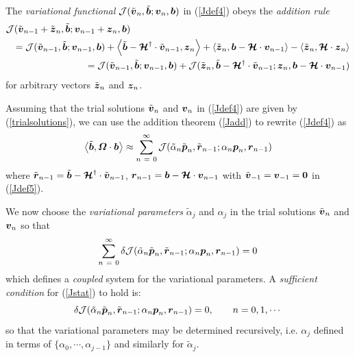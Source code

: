 The {\em variational functional\/} ${\cal J}(\tilde{\mbox{\boldmath$\mit v$\unboldmath}}_n,\tilde{\mbox{\boldmath$\mit b$\unboldmath}};{\mbox{\boldmath$\mit v$\unboldmath}}_n, {\mbox{\boldmath$\mit b$\unboldmath}})$ in (\ref{Jdef4}) obeys the {\em addition rule}
\begin{eqnarray} \label{Jadd}
\lefteqn{{\cal 
J}({\tilde{\bmi  v}}_{n-1}+{\tilde{\bmi  z}}_{n},\tilde{\bmi  b};{\bmi  
v}_{n-1}+{\bmi  z}_{n},{\bmi  b})}\nonumber\\
&&={\cal J}({\tilde{\bmi  v}}_{n-1},\tilde{\bmi  b};{\bmi  v}_{n-1},{\bmi  
b})+\left\langle{\tilde{\bmi  b}-
{\CB H}^{\dagger} \cdot {\tilde{\bmi   v}}_{  n-1}  
,{\bmi  z}_{n}}\right\rangle+
\left\langle{{\tilde{\bmi  z}}_{n},{\bmi  b}-{\CB H} \cdot {  
\bmi  v}_{  n-1}}\right\rangle-\left\langle{{\tilde{\bmi  z}}_{n},{\CB H} 
\cdot 
{\bmi   z}_{  n}}\right\rangle\nonumber\\
&&=
{\cal J}({\tilde{\bmi  v}}_{n-1},\tilde{\bmi  b};{\bmi  v}_{n-1},{\bmi  
b})+
{\cal J}({\tilde{\bmi  z}}_{n},\tilde{\bmi  b}-{\CB H}^{\dagger}\cdot 
{\tilde{\bmi  
v}}_{n-1};
{{\bmi  z}}_{n},{\bmi  b}-{\CB H}\cdot {{\bmi  v}}_{n-1})
\end{eqnarray}
for arbitrary vectors ${\tilde{\mbox{\boldmath$\mit z$\unboldmath}}}_{n}$ and ${{\mbox{\boldmath$\mit z$\unboldmath}}}_{n}$. 

Assuming that the trial solutions $\tilde{\mbox{\boldmath$\mit v$\unboldmath}}{}_{n}$ and ${\mbox{\boldmath$\mit v$\unboldmath}}{}_{n}$
in (\ref{Jdef4}) are given by (\ref{trialsolutions}), we can use the 
addition theorem
(\ref{Jadd}) to rewrite (\ref{Jdef4}) as
\begin{equation} \label{Jdef5}
	\left\langle{\tilde{\mbox{\boldmath$\mit b$\unboldmath}}, {\mbox{\boldmath$\mit \Omega$\unboldmath}} \cdot 
	{\mbox{\boldmath$\mit b$\unboldmath}}}\right\rangle 
\approx \sum\limits_{ n\ =\ 0}^{\infty }
 {\cal J}({\tilde{\alpha}}_{n}{\tilde{\mbox{\boldmath$\mit p$\unboldmath}}}_{n},{\tilde{\mbox{\boldmath$\mit r$\unboldmath}}}_{n-1};
{\alpha}_n{{\mbox{\boldmath$\mit p$\unboldmath}}}_{n},{{\mbox{\boldmath$\mit r$\unboldmath}}}_{n-1})
\end{equation}
where ${\tilde{\mbox{\boldmath$\mit r$\unboldmath}}}_{n-1}=\tilde{\mbox{\boldmath$\mit b$\unboldmath}}-{\mbox{\boldmath$\cal H$\unboldmath}}^{\dagger}\cdot 
{\tilde{\mbox{\boldmath$\mit v$\unboldmath}}}_{n-1}$,
${{\mbox{\boldmath$\mit r$\unboldmath}}}_{n-1}={\mbox{\boldmath$\mit b$\unboldmath}}-{\mbox{\boldmath$\cal H$\unboldmath}}\cdot {{\mbox{\boldmath$\mit v$\unboldmath}}}_{n-1}$
with ${\tilde{\mbox{\boldmath$\mit v$\unboldmath}}}_{-1}={{\mbox{\boldmath$\mit v$\unboldmath}}}_{-1}={\bf  0}$ in (\ref{Jdef5}).

We now choose the {\em variational parameters\/} ${\tilde{\alpha}}_{j}$ and
${{\alpha}}_{j}$ in the trial solutions $\tilde{\mbox{\boldmath$\mit v$\unboldmath}}{}_{n}$ and 
${\mbox{\boldmath$\mit v$\unboldmath}}{}_{n}$
so that
\begin{equation} \label{Jstat}
\sum\limits_{ n\ =\ 0}^{\infty }
 \delta{\cal J}({\tilde{\alpha}}_{n}{\tilde{\mbox{\boldmath$\mit p$\unboldmath}}}_{n},{\tilde{\mbox{\boldmath$\mit r$\unboldmath}}}_{n-1};
{\alpha}_n{{\mbox{\boldmath$\mit p$\unboldmath}}}_{n},{{\mbox{\boldmath$\mit r$\unboldmath}}}_{n-1})=0
\end{equation}
which defines a {\em coupled\/} system for the variational parameters. 
A {\em sufficient condition\/} for (\ref{Jstat}) to hold is:
\[
\delta{\cal J}({\tilde{\alpha}}_{n}{\tilde{\mbox{\boldmath$\mit p$\unboldmath}}}_{n},{\tilde{\mbox{\boldmath$\mit r$\unboldmath}}}_{n-1};
{\alpha}_n{{\mbox{\boldmath$\mit p$\unboldmath}}}_{n},{{\mbox{\boldmath$\mit r$\unboldmath}}}_{n-1})=0, \qquad n=0,1,\cdots
\]
so that the variational parameters may be 
determined recursively, i.e. 
${{\alpha}}_{j}$ defined in terms of 
$\{ {{\alpha}}_{0},\cdots,{{\alpha}}_{j-1} \}$ and similarly for 
${\tilde{\alpha}}_{j}$.

